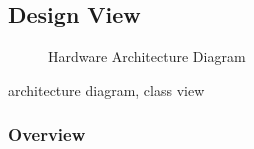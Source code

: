 \documentclass[11pt]{article}
\begin{document}
\subsection{Design View}
\begin{figure}[H]
	\caption{Hardware Architecture Diagram}
\end{figure}

architecture diagram, class view
\subsubsection{Overview}
\end{document}
